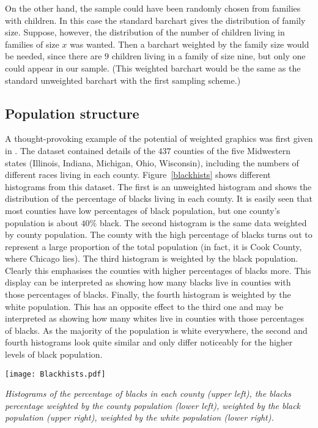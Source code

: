 \documentclass{svmult}
\begin{document}
On the other hand, the sample could have been randomly chosen from families with children.  In this case the standard barchart gives the distribution of family size.  Suppose, however, the distribution of the number of children living in families of size $x$ was wanted.  Then a barchart weighted by the family size would be needed, since there are $9$ children living in a family of size nine, but only one could appear in our sample.  (This weighted barchart would be the same as the standard unweighted barchart with the first sampling scheme.)

\subsection{Population structure}
\label{pop}
A thought-provoking example of the potential of weighted graphics was first given in \cite{unwin:1998a}.  The dataset contained details of the $437$ counties of the five Midwestern states (Illinois, Indiana, Michigan, Ohio, Wisconsin), including the numbers of different races living in each county.  Figure~\ref{blackhists} shows different histograms from this dataset.  The first is an unweighted histogram and shows the distribution of the percentage of blacks living in each county.  It is easily seen that most counties have low percentages of black population, but one county's population is about $40\%$ black.  The second histogram is the same data weighted by county population.  The county with the high percentage of blacks turns out to represent a large proportion of the total population (in fact, it is Cook County, where Chicago lies).  The third histogram is weighted by the black population.  Clearly this emphasises the counties with higher percentages of blacks more.  This display can be interpreted as showing how many blacks live in counties with those percentages of blacks.  Finally, the fourth histogram is weighted by the white population.  This has an opposite effect to the third one and may be interpreted as showing how many whites live in counties with those percentages of blacks.  As the majority of the population is white everywhere, the second and fourth histograms look quite similar and only differ noticeably for the higher levels of black population.

\begin{center}
      \texttt{[image: Blackhists.pdf]}
      \caption{\label{blackhists}\em Histograms of the percentage of blacks in each county (upper left), the blacks percentage weighted by the county population (lower left), weighted by the black population (upper right), weighted by the white population (lower right).}
      \end{center}
\end{document}
